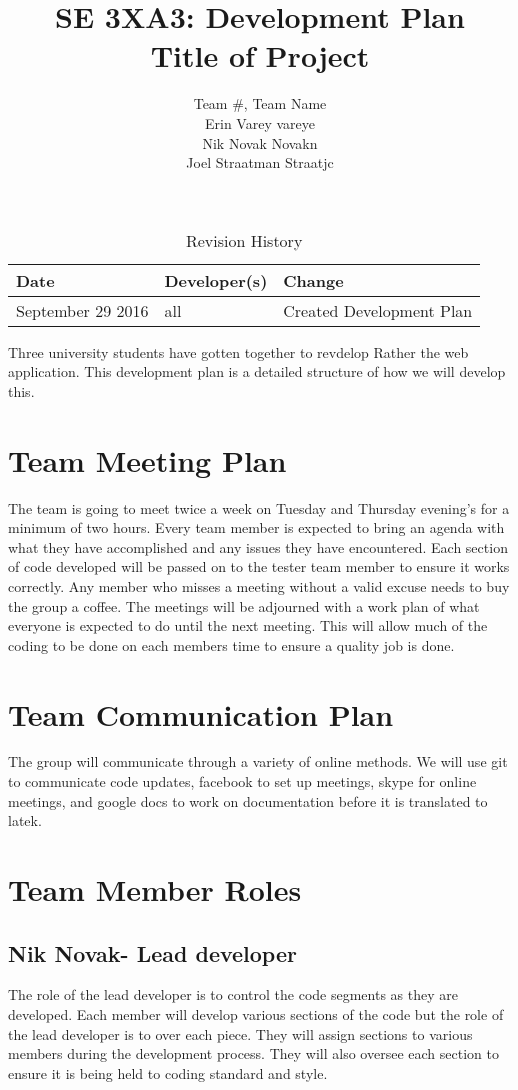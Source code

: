 \documentclass{article}
\title{SE 3XA3: Development Plan\\Title of Project}
\author{Team \#, Team Name
		\\ Erin Varey vareye
		\\ Nik Novak Novakn
		\\ Joel Straatman Straatjc
}
\date{}
\begin{document}
\begin{table}[hp]
\caption{Revision History} \label{TblRevisionHistory}
\begin{tabularx}{\textwidth}{llX}
\toprule
\textbf{Date} & \textbf{Developer(s)} & \textbf{Change}\\
\midrule
September 29 2016 & all & Created Development Plan\\

\bottomrule
\end{tabularx}
\end{table}
\newpage
\maketitle
Three university students have gotten together to revdelop Rather the web application. 
This development plan is a detailed structure of how we will develop this.
\section{Team Meeting Plan}
The team is going to meet twice a week on Tuesday and Thursday evening's for a minimum of two hours. Every team member is expected to bring an agenda with what they have accomplished and any issues they have encountered. Each section of code developed will be passed on to the tester team member to ensure it works correctly. Any member who misses a meeting without a valid excuse needs to buy the group a coffee. The meetings will be adjourned with a work plan of what everyone is expected to do until the next meeting. This will allow much of the coding to be done on each members time to ensure a quality job is done. 
\section{Team Communication Plan}
The group will communicate through a variety of online methods. We will use git to communicate code updates, facebook to set up meetings, skype for online meetings, and google docs to work on documentation before it is translated to latek.
\section{Team Member Roles}
\subsection{Nik Novak- Lead developer}
The role of the lead developer is to control the code segments as they are developed. Each member will develop various sections of the code but the role of the lead developer is to over each piece. They will assign sections to various members during the development process. They will also oversee each section to ensure it is being held to coding standard and style. 
\end{document}
